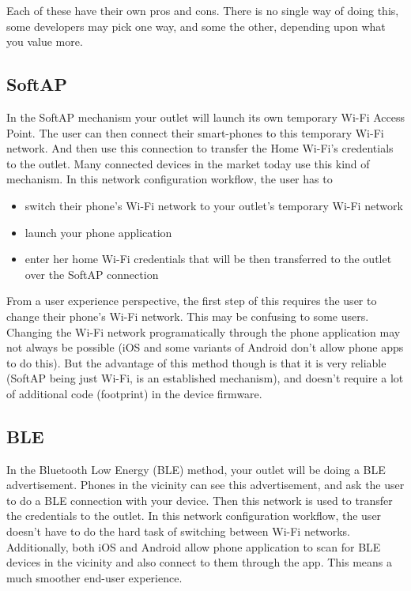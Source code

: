 \documentclass[main.tex]{subfiles}
\begin{document}
Each of these have their own pros and cons. There is no single way of doing this, some developers may pick one way, and some the other, depending upon what you value more.

\subsection{SoftAP}
In the SoftAP mechanism your outlet will launch its own temporary Wi-Fi Access Point. The user can then connect their smart-phones to this temporary Wi-Fi network. And then use this connection to transfer the Home Wi-Fi's credentials to the outlet. Many connected devices in the market today use this kind of mechanism. In this network configuration workflow, the user has to 
\begin{itemize}
    \item switch their phone's Wi-Fi network to your outlet's temporary Wi-Fi network
    \item launch your phone application
    \item enter her home Wi-Fi credentials that will be then transferred to the outlet over the SoftAP connection
\end{itemize}
From a user experience perspective, the first step of this requires the user to change their phone's Wi-Fi network. This may be confusing to some users. Changing the Wi-Fi network programatically through the phone application may not always be possible (iOS and some variants of Android don't allow phone apps to do this).
But the advantage of this method though is that it is very reliable (SoftAP being just Wi-Fi, is an established mechanism), and doesn't require a lot of additional code (footprint) in the device firmware.

\subsection{BLE}

In the Bluetooth Low Energy (BLE) method, your outlet will be doing a BLE advertisement. Phones in the vicinity can see this advertisement, and ask the user to do a BLE connection with your device. Then this network is used to transfer the credentials to the outlet.
In this network configuration workflow, the user doesn't have to do the hard task of switching between Wi-Fi networks. Additionally, both iOS and Android allow phone application to scan for BLE devices in the vicinity and also connect to them through the app. This means a much smoother end-user experience.
\end{document}
